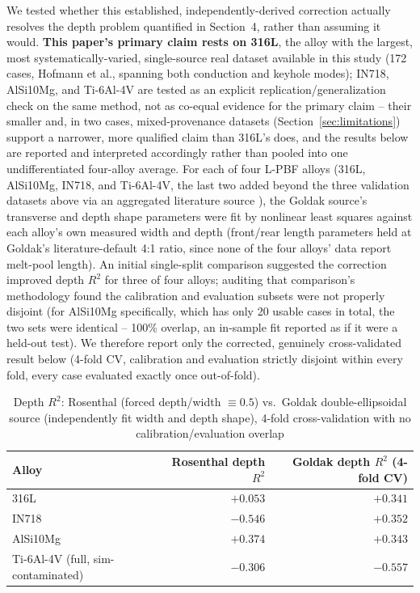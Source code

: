 \documentclass[12pt]{article}
\begin{document}
We tested whether this established, independently-derived correction actually resolves the depth problem quantified in Section~4, rather than assuming it would. \textbf{This paper's primary claim rests on 316L}, the alloy with the largest, most systematically-varied, single-source real dataset available in this study (172 cases, Hofmann et al., spanning both conduction and keyhole modes); IN718, AlSi10Mg, and Ti-6Al-4V are tested as an explicit replication/generalization check on the same method, not as co-equal evidence for the primary claim -- their smaller and, in two cases, mixed-provenance datasets (Section~\ref{sec:limitations}) support a narrower, more qualified claim than 316L's does, and the results below are reported and interpreted accordingly rather than pooled into one undifferentiated four-alloy average. For each of four L-PBF alloys (316L, AlSi10Mg, IN718, and Ti-6Al-4V, the last two added beyond the three validation datasets above via an aggregated literature source \cite{meltpoolnet2022}), the Goldak source's transverse and depth shape parameters were fit by nonlinear least squares against each alloy's own measured width and depth (front/rear length parameters held at Goldak's literature-default 4:1 ratio, since none of the four alloys' data report melt-pool length). An initial single-split comparison suggested the correction improved depth $R^2$ for three of four alloys; auditing that comparison's methodology found the calibration and evaluation subsets were not properly disjoint (for AlSi10Mg specifically, which has only 20 usable cases in total, the two sets were identical -- 100\% overlap, an in-sample fit reported as if it were a held-out test). We therefore report only the corrected, genuinely cross-validated result below (4-fold CV, calibration and evaluation strictly disjoint within every fold, every case evaluated exactly once out-of-fold).

\begin{table}[!t]
\centering
\caption{Depth $R^2$: Rosenthal (forced depth/width $\equiv 0.5$) vs.\ Goldak double-ellipsoidal source (independently fit width and depth shape), 4-fold cross-validation with no calibration/evaluation overlap}
\label{tab:goldak}
\begin{tabular}{@{}lrr@{}}
\toprule
Alloy & Rosenthal depth $R^2$ & Goldak depth $R^2$ (4-fold CV) \\
\midrule
316L                        & $+0.053$ & $\mathbf{+0.341}$ \\
IN718                       & $-0.546$ & $\mathbf{+0.352}$ \\
AlSi10Mg                    & $+0.374$ & $+0.343$ \\
Ti-6Al-4V (full, sim-contaminated) & $-0.306$ & $-0.557$ \\
\bottomrule
\end{tabular}
\end{table}
\end{document}
